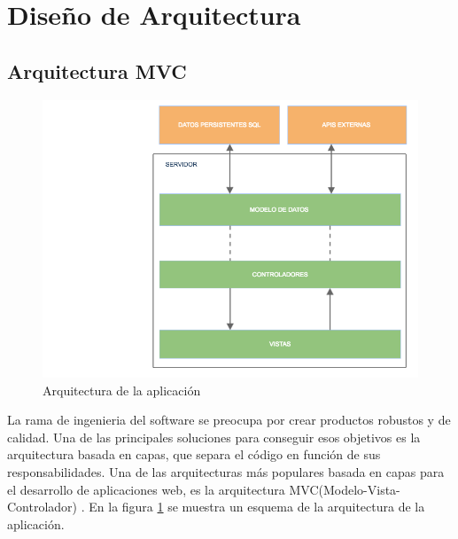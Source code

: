 \section{Diseño de Arquitectura}

\subsection{Arquitectura MVC}

\begin{figure}
\begin{center}
\includegraphics[width=1.0\textwidth]{imagenes/arquitectura.png}
\caption{Arquitectura de la aplicación}
\label{arquitectura}
\end{center}
\end{figure}

La rama de ingenieria del software se preocupa por crear productos robustos y de calidad. Una de las principales soluciones para conseguir esos objetivos es la arquitectura basada en capas, que separa el código en función de sus responsabilidades. Una de las arquitecturas más populares basada en capas para el desarrollo de aplicaciones web, es la arquitectura MVC(Modelo-Vista-Controlador) \cite{mvc}. En la figura \ref{arquitectura} se muestra un esquema de la arquitectura de la aplicación.


